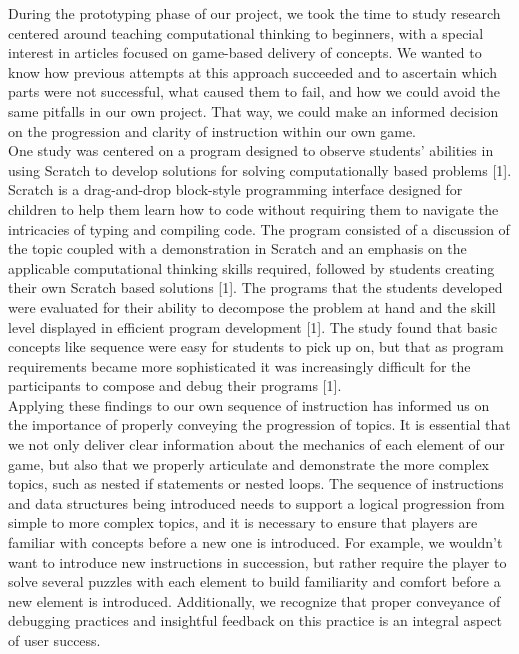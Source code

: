 During the prototyping phase of our project, we took the time to study research 
centered around teaching computational thinking to beginners, with a special interest 
in articles focused on game-based delivery of concepts. We wanted to know how 
previous attempts at this approach succeeded and to ascertain which parts were 
not successful, what caused them to fail, and how we could avoid the same pitfalls 
in our own project. That way, we could make an informed decision on the 
progression and clarity of instruction within our own game.\\

One study was centered on a program designed to observe students’ abilities in 
using Scratch to develop solutions for solving computationally based problems [1]. 
Scratch is a drag-and-drop block-style programming interface designed for children 
to help them learn how to code without requiring them to navigate the intricacies of 
typing and compiling code. The program consisted of a discussion of the topic 
coupled with a demonstration in Scratch and an emphasis on the applicable 
computational thinking skills required, followed by students creating their own 
Scratch based solutions [1]. The programs that the students developed were evaluated 
for their ability to decompose the problem at hand and the skill level displayed in efficient program 
development [1]. The study found that basic concepts like sequence were easy for 
students to pick up on, but that as program requirements became more sophisticated
 it was increasingly difficult for the participants to compose and debug their programs [1].\\

Applying these findings to our own sequence of instruction has informed us on the 
importance of properly conveying the progression of topics. It is essential that we 
not only deliver clear information about the mechanics of each element of our game, 
but also that we properly articulate and demonstrate the more complex topics, such 
as nested if statements or nested loops. The sequence of instructions and data structures 
being introduced needs to support a logical progression from simple to more complex 
topics, and it is necessary to ensure that players are familiar with concepts before a new 
one is introduced. For example, we wouldn’t want to introduce new instructions in 
succession, but rather require the player to solve several puzzles with each element to 
build familiarity and comfort before a new element is introduced.  Additionally, we 
recognize that proper conveyance of debugging practices and insightful feedback 
on this practice is an integral aspect of user success.\\

